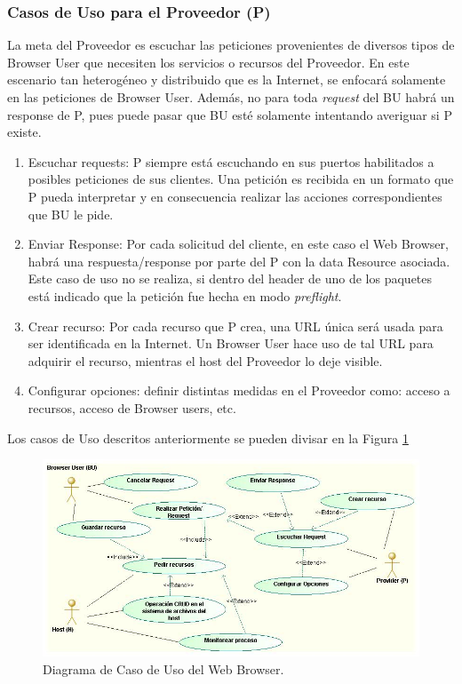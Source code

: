 		\subsubsection{Casos de Uso para el Proveedor (P)}
		La meta del Proveedor es escuchar las peticiones provenientes de diversos tipos de Browser User que necesiten los servicios o recursos del Proveedor. En este escenario tan heterogéneo y distribuido que es la Internet, se enfocará solamente en las peticiones de Browser User. Además, no para toda \textit{request} del BU habrá un response de P, pues puede pasar que BU esté solamente intentando averiguar si P existe.
			\begin{enumerate}
				\item Escuchar requests: P siempre está escuchando en sus puertos habilitados a posibles peticiones de sus clientes. Una petición es recibida en un formato que P pueda interpretar y en consecuencia realizar las acciones correspondientes que BU le pide. 
				\item Enviar Response: Por cada solicitud del cliente, en este caso el Web Browser, habrá una respuesta/response por parte del P con la data Resource asociada. Este caso de uso no se realiza, si dentro del header de uno de los paquetes está indicado que la petición fue hecha en modo \textit{preflight}.
				\item Crear recurso: Por cada recurso que P crea, una URL única será usada para ser identificada en la Internet. Un Browser User hace uso de tal URL para adquirir el recurso, mientras el host del Proveedor lo deje visible.
				\item Configurar opciones: definir distintas medidas en el Proveedor como: acceso a recursos, acceso de Browser users, etc.
			\end{enumerate}

		Los casos de Uso descritos anteriormente se pueden divisar en la Figura \ref{fig:CUBrowser}

	    \begin{figure}[h!t]
	        \centering
	        \includegraphics[scale=0.45]{figures/chap4/UCBrowser.jpg}
	        \caption{Diagrama de Caso de Uso del Web Browser.}
	        \label{fig:CUBrowser}
	    \end{figure}


